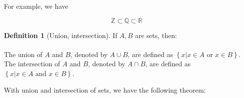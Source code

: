 \documentclass{article}
\theoremstyle{MyNonumberplain}
\theoremstyle{break}
\newcommand{\R}{\mathbb{R}}
\newcommand{\Q}{\mathbb{Q}}
\newcommand{\Z}{\mathbb{Z}}
\theoremstyle{break}
\theoremstyle{break}
\theoremstyle{definition}
\theoremstyle{break}
\newtheorem{definition}{Definition}[section]
\begin{document}
For example, we have 

        $$\Z\subset\Q\subset\R$$

\begin{defbox}
    \begin{definition}[Union, intersection]
        If $A,B$ are sets, then:\\
        \\
        The union of $A$ and $B$, denoted by $A \cup B$, are defined as $\left\{ x|x \in A \text{ or } x \in B \right\}$. \\
        
        The intersection of $A$ and $B$, denoted by $A \cap B$, are defined as $\left\{ x|x \in A \text{ and } x \in B \right\}$.            
    \end{definition}    
\end{defbox}

With union and intersection of sets, we have the following theorem:
\end{document}
